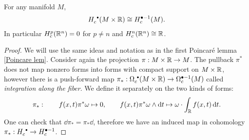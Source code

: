 \begin{thm}
    For any manifold $M$, 
    \[H_c^{\smbullet }(M\times \bbR)\cong H_c^{\bullet-1}(M).\] 
    In particular $H_c^p(\mathbb{R}^n)=0$ for $p\neq n$ and $H_c^n(\mathbb{R}^n)\cong\mathbb{R}$.
\end{thm}
\begin{proof}
    We will use the same ideas and notation as in the first Poincar\'e lemma \ref{Poincare lem}. Consider again the projection $\pi:M\times \mathbb{R}\to M$. The pullback $\pi^\ast$ does not map nonzero forms into forms with compact support on $M\times\mathbb{R}$, however there is a push-forward map $\pi_\ast:\Omega_c^{\smbullet }(M\times\bbR)\to \Omega_c^{\bullet-1}(M)$ called \emph{integration along the fiber}. We define it separately on the two kinds of forms:
    \begin{equation}
        \pi_\ast: \quad\quad f(x,t)\pi^\ast\omega\mapsto  0,\quad\quad f(x,t)\pi^\ast \omega \wedge \mathop{}\!\mathrm{d} t\mapsto  \omega\cdot\int_{\mathbb{R}} f(x,t)\mathop{}\!\mathrm{d} t. 
    \end{equation}
    One can check that $\dd\pi_\ast=\pi_\ast \dd$, therefore we have an induced map in cohomology $\pi_\ast:H_c^{\smbullet }\to H_c^{\bullet-1}$.
    

\end{proof}
